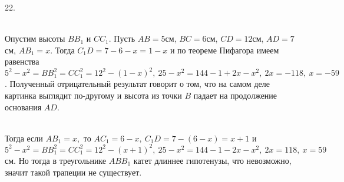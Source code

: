 22. \begin{figure}[ht!]
\end{figure}\\
Опустим высоты $BB_1$ и $CC_1.$ Пусть $AB=5$см, $BC=6$см, $CD=12$см, $AD=7$см, $AB_1=x.$ Тогда $C_1D=7-6-x=1-x$ и по теореме Пифагора имеем равенства
$5^2-x^2=BB_1^2=CC_1^2=12^2-(1-x)^2,\ 25-x^2=144-1+2x-x^2,\ 2x=-118,\ x=-59$. Полученный отрицательный результат говорит о том, что на самом деле картинка выглядит по-другому и высота из точки $B$ падает на продолжение основания $AD.$\newpage\noindent
\begin{figure}[ht!]
\end{figure}\\
Тогда если $AB_1=x,$ то $AC_1=6-x,\ C_1D=7-(6-x)=x+1$ и $5^2-x^2=BB_1^2=CC_1^2=12^2-(x+1)^2,\ 25-x^2=144-1-2x-x^2,\ 2x=118,\ x=59$см. Но тогда в треугольнике
$ABB_1$ катет длиннее гипотенузы, что невозможно, значит такой трапеции не существует.\\
